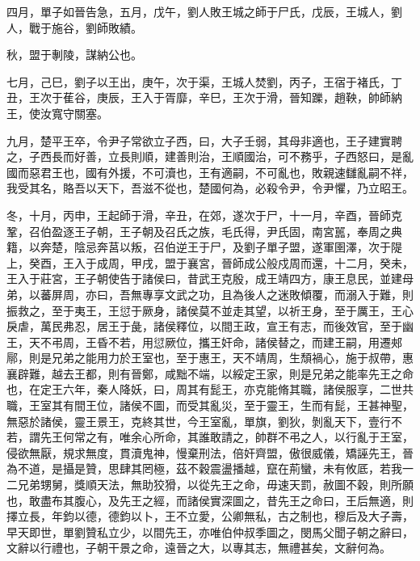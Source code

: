 \begin{pinyinscope}
四月，單子如晉告急，五月，戊午，劉人敗王城之師于尸氏，戊辰，王城人，劉人，戰于施谷，劉師敗績。

秋，盟于剸陵，謀納公也。

七月，己巳，劉子以王出，庚午，次于渠，王城人焚劉，丙子，王宿于褚氏，丁丑，王次于萑谷，庚辰，王入于胥靡，辛巳，王次于滑，晉知躒，趙鞅，帥師納王，使汝寬守關塞。

九月，楚平王卒，令尹子常欲立子西，曰，大子壬弱，其母非適也，王子建實聘之，子西長而好善，立長則順，建善則治，王順國治，可不務乎，子西怒曰，是亂國而惡君王也，國有外援，不可瀆也，王有適嗣，不可亂也，敗親速讎亂嗣不祥，我受其名，賂吾以天下，吾滋不從也，楚國何為，必殺令尹，令尹懼，乃立昭王。

冬，十月，丙申，王起師于滑，辛丑，在郊，遂次于尸，十一月，辛酉，晉師克鞏，召伯盈逐王子朝，王子朝及召氏之族，毛氏得，尹氏固，南宮嚚，奉周之典籍，以奔楚，陰忌奔莒以叛，召伯逆王于尸，及劉子單子盟，遂軍圉澤，次于隄上，癸酉，王入于成周，甲戌，盟于襄宮，晉師成公般戍周而還，十二月，癸未，王入于莊宮，王子朝使告于諸侯曰，昔武王克殷，成王靖四方，康王息民，並建母弟，以蕃屏周，亦曰，吾無專享文武之功，且為後人之迷敗傾覆，而溺入于難，則振救之，至于夷王，王愆于厥身，諸侯莫不並走其望，以祈王身，至于厲王，王心戾虐，萬民弗忍，居王于彘，諸侯釋位，以間王政，宣王有志，而後效官，至于幽王，天不弔周，王昏不若，用愆厥位，攜王奸命，諸侯替之，而建王嗣，用遷郟鄏，則是兄弟之能用力於王室也，至于惠王，天不靖周，生頹禍心，施于叔帶，惠襄辟難，越去王都，則有晉鄭，咸黜不端，以綏定王家，則是兄弟之能率先王之命也，在定王六年，秦人降妖，曰，周其有髭王，亦克能脩其職，諸侯服享，二世共職，王室其有間王位，諸侯不圖，而受其亂災，至于靈王，生而有髭，王甚神聖，無惡於諸侯，靈王景王，克終其世，今王室亂，單旗，劉狄，剝亂天下，壹行不若，謂先王何常之有，唯余心所命，其誰敢請之，帥群不弔之人，以行亂于王室，侵欲無厭，規求無度，貫瀆鬼神，慢棄刑法，倍奸齊盟，傲很威儀，矯誣先王，晉為不道，是攝是贊，思肆其罔極，茲不穀震盪播越，竄在荊蠻，未有攸厎，若我一二兄弟甥舅，獎順天法，無助狡猾，以從先王之命，毋速天罰，赦圖不穀，則所願也，敢盡布其腹心，及先王之經，而諸侯實深圖之，昔先王之命曰，王后無適，則擇立長，年鈞以德，德鈞以卜，王不立愛，公卿無私，古之制也，穆后及大子壽，早天即世，單劉贊私立少，以間先王，亦唯伯仲叔季圖之，閔馬父聞子朝之辭曰，文辭以行禮也，子朝干景之命，遠晉之大，以專其志，無禮甚矣，文辭何為。


\end{pinyinscope}
